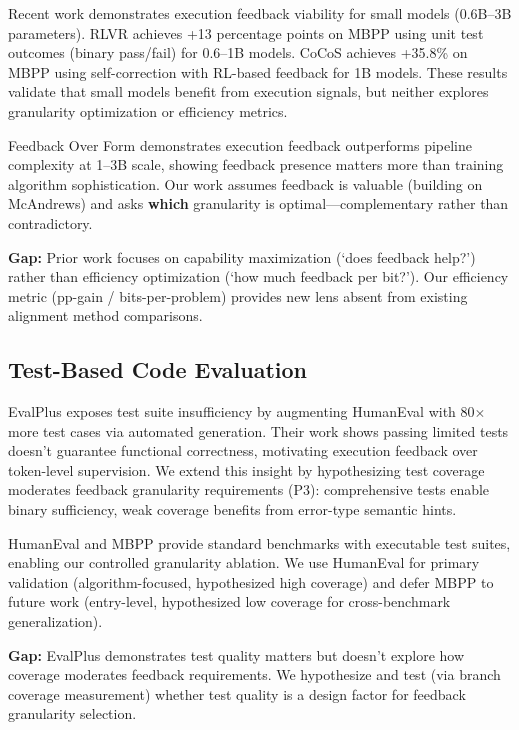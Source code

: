 Recent work demonstrates execution feedback viability for small models (0.6B--3B parameters). RLVR \cite{skopin2026rlvr} achieves +13 percentage points on MBPP using unit test outcomes (binary pass/fail) for 0.6--1B models. CoCoS \cite{cho2025cocos} achieves +35.8\% on MBPP using self-correction with RL-based feedback for 1B models. These results validate that small models benefit from execution signals, but neither explores granularity optimization or efficiency metrics.

Feedback Over Form \cite{mcandrews2026feedback} demonstrates execution feedback outperforms pipeline complexity at 1--3B scale, showing feedback presence matters more than training algorithm sophistication. Our work assumes feedback is valuable (building on McAndrews) and asks \textbf{which} granularity is optimal---complementary rather than contradictory.

\textbf{Gap:} Prior work focuses on capability maximization (`does feedback help?') rather than efficiency optimization (`how much feedback per bit?'). Our efficiency metric (pp-gain / bits-per-problem) provides new lens absent from existing alignment method comparisons.

\subsection{Test-Based Code Evaluation}

EvalPlus \cite{liu2023your} exposes test suite insufficiency by augmenting HumanEval with 80$\times$ more test cases via automated generation. Their work shows passing limited tests doesn't guarantee functional correctness, motivating execution feedback over token-level supervision. We extend this insight by hypothesizing test coverage moderates feedback granularity requirements (P3): comprehensive tests enable binary sufficiency, weak coverage benefits from error-type semantic hints.

HumanEval \cite{austin2021program} and MBPP \cite{chen2021evaluating} provide standard benchmarks with executable test suites, enabling our controlled granularity ablation. We use HumanEval for primary validation (algorithm-focused, hypothesized high coverage) and defer MBPP to future work (entry-level, hypothesized low coverage for cross-benchmark generalization).

\textbf{Gap:} EvalPlus demonstrates test quality matters but doesn't explore how coverage moderates feedback requirements. We hypothesize and test (via branch coverage measurement) whether test quality is a design factor for feedback granularity selection.

